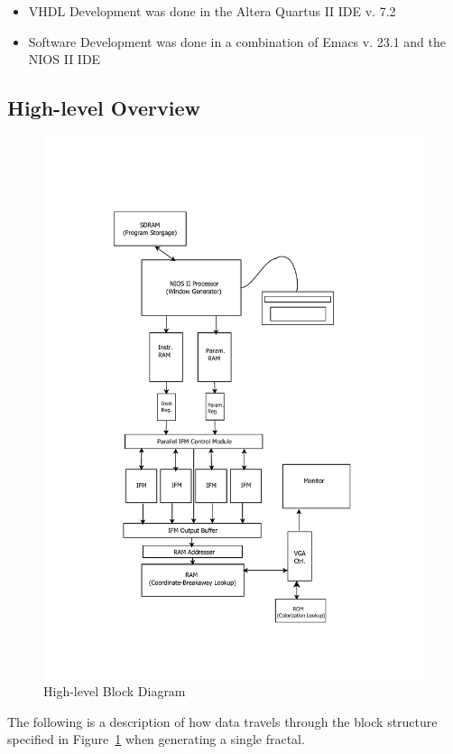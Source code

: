 \documentclass{article}
\begin{document}
\begin{itemize}
\item VHDL Development was done in the Altera Quartus II IDE v. 7.2
\item Software Development was done in a combination of Emacs v. 23.1 and the NIOS II IDE
\end{itemize}

\subsection{High-level Overview}


\begin{figure}\label{fig:block}
  \centering
	\includegraphics[width=\textwidth]{block_diagrams/juli_arch.pdf}
  \caption{High-level Block Diagram}
\end{figure}

The following is a description of how data travels through the block structure specified in Figure~\ref{fig:block} when generating a single fractal.
\end{document}
